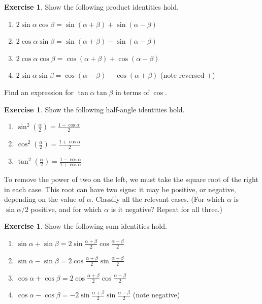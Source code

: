 \documentclass[a4paper,leqno]{article}
\numberwithin{equation}{section}
\theoremstyle{definition}
\newtheorem{exercise}[equation]{Exercise}
\theoremstyle{remark}
\begin{document}
\begin{exercise}
  Show the following product identities hold.
  \begin{enumerate}
    \item $ 2 \sin \alpha \cos \beta = \sin(\alpha + \beta) + \sin(\alpha - \beta) $
    \item $ 2 \cos \alpha \sin \beta = \sin(\alpha + \beta) - \sin(\alpha - \beta) $
    \item $ 2 \cos \alpha \cos \beta = \cos(\alpha + \beta) + \cos(\alpha - \beta) $
    \item $ 2 \sin \alpha \sin \beta = \cos(\alpha - \beta) - \cos(\alpha + \beta) $ (note reversed $ \pm $)
  \end{enumerate}
  Find an expression for $ \tan \alpha \tan \beta $ in terms of $ \cos $.
\end{exercise}
\begin{exercise}
  Show the following half-angle identities hold.
  \begin{enumerate}
    \item $ \sin^2 \left(\frac{\alpha}{2}\right) = \frac{1 - \cos \alpha}{2} $
    \item $ \cos^2 \left(\frac{\alpha}{2}\right) = \frac{1 + \cos \alpha}{2} $
    \item $ \tan^2 \left(\frac{\alpha}{2}\right) = \frac{1 - \cos \alpha}{1 + \cos \alpha} $
  \end{enumerate}
  To remove the power of two on the left, we must take the square root of the right in each case. This root
  can have two signs: it may be positive, or negative, depending on the value of $ \alpha $. Classify all the
  relevant cases. (For which $ \alpha $ is $ \sin \alpha/2 $ positive, and for which $ \alpha $ is it negative? Repeat for all three.)
\end{exercise}
\begin{exercise}
  Show the following sum identities hold.
  \begin{enumerate}
    \item $ \sin \alpha + \sin \beta = 2\sin \frac{\alpha + \beta}{2} \cos \frac{\alpha - \beta}{2} $
    \item $ \sin \alpha - \sin \beta = 2\cos \frac{\alpha + \beta}{2} \sin \frac{\alpha - \beta}{2} $
    \item $ \cos \alpha + \cos \beta = 2\cos \frac{\alpha + \beta}{2} \cos \frac{\alpha - \beta}{2} $
    \item $ \cos \alpha - \cos \beta = -2\sin \frac{\alpha + \beta}{2} \sin \frac{\alpha - \beta}{2} $ (note negative)
  \end{enumerate}
\end{exercise}
\end{document}

